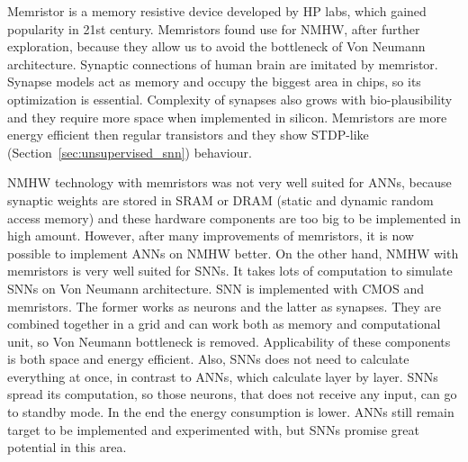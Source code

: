 Memristor is a memory resistive device developed by HP labs, which gained popularity in 21st century. Memristors found use for NMHW, after further exploration, because they allow us to avoid the bottleneck of Von Neumann architecture. Synaptic connections of human brain are imitated by memristor. Synapse models act as memory and occupy the biggest area in chips, so its optimization is essential. Complexity of synapses also grows with bio-plausibility and they require more space when implemented in silicon. Memristors are more energy efficient then regular transistors and they show STDP-like (Section~\ref{sec:unsupervised_snn})  behaviour. \cite{fpga-impl-nn}

NMHW technology with memristors was not very well suited for ANNs, because synaptic weights are stored in SRAM or DRAM (static and dynamic random access memory) and these hardware components are too big to be implemented in high amount. However, after many improvements of memristors, it is now possible to implement ANNs on NMHW better. On the other hand, NMHW with memristors is very well suited for SNNs. It takes lots of computation to simulate SNNs on Von Neumann architecture. SNN is implemented with CMOS and memristors. The former works as neurons and the latter as synapses. They are combined together in a grid and can work both as memory and computational unit, so Von Neumann bottleneck is removed. Applicability of these components is both space and energy efficient. Also, SNNs does not need to calculate everything at once, in contrast to ANNs, which calculate layer by layer. SNNs spread its computation, so those neurons, that does not receive any input, can go to standby mode. In the end the energy consumption is lower. ANNs still remain target to be implemented and experimented with, but SNNs promise great potential in this area. \cite{memristors}

